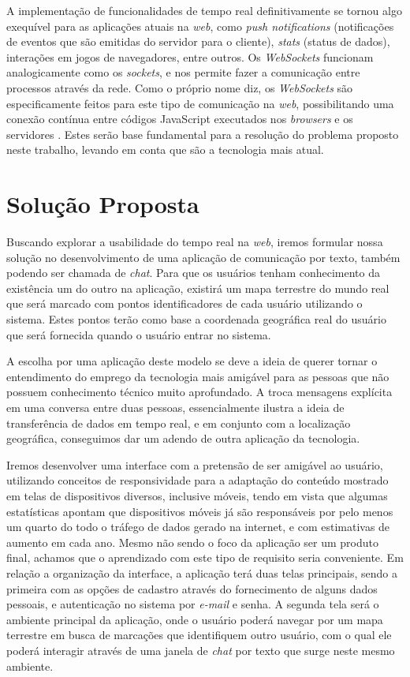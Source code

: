 A implementação de funcionalidades de tempo real definitivamente se tornou algo exequível para as aplicações atuais na \textit{web}, como \textit{push notifications} (notificações de eventos que são emitidas do servidor para o cliente), \textit{stats} (status de dados), interações em jogos de navegadores, entre outros. Os \textit{WebSockets} funcionam analogicamente como os \textit{sockets}, e nos permite fazer a comunicação entre processos através da rede. Como o próprio nome diz, os \textit{WebSockets} são especificamente feitos para este tipo de comunicação na \textit{web}, possibilitando uma conexão contínua entre códigos JavaScript executados nos \textit{browsers} e os servidores . Estes serão base fundamental para a resolução do problema proposto neste trabalho, levando em conta que são a tecnologia mais atual.

\section{Solução Proposta}
Buscando explorar a usabilidade do tempo real na \textit{web}, iremos formular nossa solução no desenvolvimento de uma aplicação de comunicação por texto, também podendo ser chamada de \textit{chat}. Para que os usuários tenham conhecimento da existência um do outro na aplicação, existirá um mapa terrestre do mundo real que será marcado com pontos identificadores de cada usuário utilizando o sistema. Estes pontos terão como base a coordenada geográfica real do usuário que será fornecida quando o usuário entrar no sistema.

A escolha por uma aplicação deste modelo se deve a ideia de querer tornar o entendimento do emprego da tecnologia mais amigável para as pessoas que não possuem conhecimento técnico muito aprofundado. A troca mensagens explícita em uma conversa entre duas pessoas, essencialmente ilustra a ideia de transferência de dados em tempo real, e em conjunto com a localização geográfica, conseguimos dar um adendo de outra aplicação da tecnologia.

Iremos desenvolver uma interface com a pretensão de ser amigável ao usuário, utilizando conceitos de responsividade para a adaptação do conteúdo mostrado em telas de dispositivos diversos, inclusive móveis, tendo em vista que algumas estatísticas \cite{internet-traffic-stats1} apontam que dispositivos móveis já são responsáveis por pelo menos um quarto do todo o tráfego de dados gerado na internet, e com estimativas \cite{internet-traffic-stats2} \cite{internet-traffic-stats3} de aumento em cada ano. Mesmo não sendo o foco da aplicação ser um produto final, achamos que o aprendizado com este tipo de requisito seria conveniente. Em relação a organização da interface, a aplicação terá duas telas principais, sendo a primeira com as opções de cadastro através do fornecimento de alguns dados pessoais, e autenticação no sistema por \textit{e-mail} e senha. A segunda tela será o ambiente principal da aplicação, onde o usuário poderá navegar por um mapa terrestre em busca de marcações que identifiquem outro usuário, com o qual ele poderá interagir através de uma janela de \textit{chat} por texto que surge neste mesmo ambiente.

